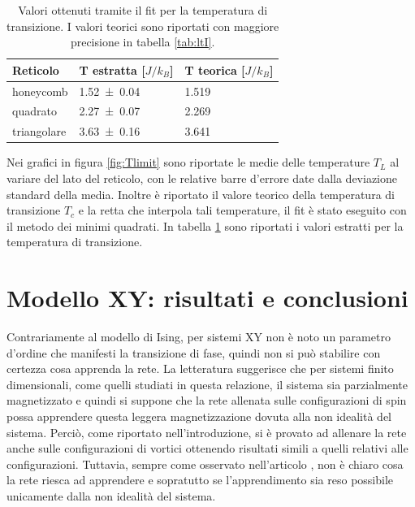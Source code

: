 \documentclass{article}
\begin{document}
\begin{table}[!ht]
\begin{center}
\begin{tabular}{lll}
\toprule
Reticolo & T estratta [$J/k_B$] & T teorica [$J/k_B$] \\
\midrule
honeycomb & \num{1.52 \pm 0.04} & \num{1.519} \\
quadrato & \num{2.27 \pm 0.07} & \num{2.269} \\
triangolare & \num{3.63 \pm 0.16} & \num{3.641} \\
\bottomrule
\end{tabular}
\end{center}
\caption{Valori ottenuti tramite il fit per la temperatura di transizione. I valori teorici sono riportati con maggiore precisione in tabella \ref{tab:ltI}.}
\label{tab:Tising}
\end{table}

Nei grafici in figura \ref{fig:Tlimit} sono riportate le medie delle temperature $T_L$ al variare del lato del reticolo, con le relative barre d'errore date dalla deviazione standard della media.
Inoltre è riportato il valore teorico della temperatura di transizione $T_c$ e la retta che interpola tali temperature, il fit è stato eseguito con il metodo dei minimi quadrati.
In tabella \ref{tab:Tising} sono riportati i valori estratti per la temperatura di transizione.


\section{Modello XY: risultati e conclusioni}
Contrariamente al modello di Ising, per sistemi XY non è noto un parametro d'ordine che manifesti la transizione di fase, quindi non si può stabilire con certezza cosa apprenda la rete.
La letteratura \cite{melko} suggerisce che per sistemi finito dimensionali, come quelli studiati in questa relazione, il sistema sia parzialmente magnetizzato e quindi si suppone che la rete allenata sulle configurazioni di spin possa apprendere questa leggera magnetizzazione dovuta alla non idealità del sistema.
Perciò, come riportato nell'introduzione, si è provato ad allenare la rete anche sulle configurazioni di vortici ottenendo risultati simili a quelli relativi alle configurazioni.
Tuttavia, sempre come osservato nell'articolo \cite{melko}, non è chiaro cosa la rete riesca ad apprendere e sopratutto se l'apprendimento sia reso possibile unicamente dalla non idealità del sistema.
\end{document}
